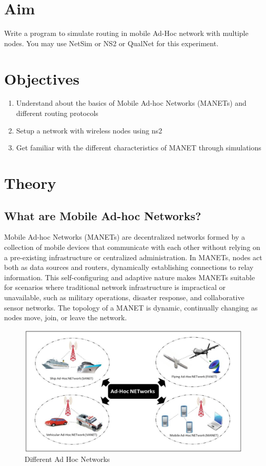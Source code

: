 \documentclass[11pt]{article}
\begin{document}
\tableofcontents
\thispagestyle{empty}
\clearpage

\setcounter{page}{1}

\section{Aim}
Write a program to simulate routing in mobile Ad-Hoc network with multiple nodes.
You may use NetSim or NS2 or QualNet for this experiment.

\section{Objectives}

\begin{enumerate}
    \item Understand about the basics of Mobile Ad-hoc Networks (MANETs) and different
          routing protocols
    \item Setup a network with wireless nodes using ns2
    \item Get familiar with the different characteristics of MANET through simulations
\end{enumerate}

\section{Theory}
\subsection{What are Mobile Ad-hoc Networks?}

Mobile Ad-hoc Networks (MANETs) are decentralized networks formed by a collection of mobile devices that communicate with each other without relying on a pre-existing infrastructure or centralized administration. In MANETs, nodes act both as data sources and routers, dynamically establishing connections to relay information. This self-configuring and adaptive nature makes MANETs suitable for scenarios where traditional network infrastructure is impractical or unavailable, such as military operations, disaster response, and collaborative sensor networks. The topology of a MANET is dynamic, continually changing as nodes move, join, or leave the network.

\begin{figure}[H]
    \centering
    \includegraphics[width=.95\textwidth]{Mobile Ad hoc networks/Mobile Ad hoc networks0.jpg}
    \caption{Different Ad Hoc Networks}
\end{figure}
\end{document}

